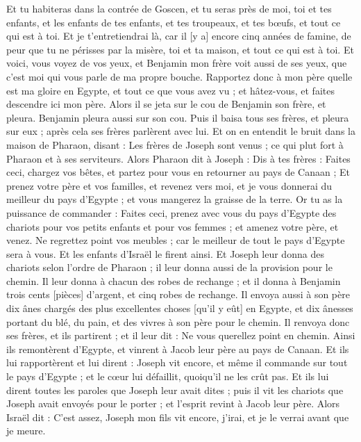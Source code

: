 \begin{multicols}{2}
Et tu habiteras dans la contrée de Goscen, et tu seras près de moi, toi et tes enfants, et les enfants de tes enfants, et tes troupeaux, et tes bœufs, et tout ce qui est à toi.
Et je t'entretiendrai là, car il [y a] encore cinq années de famine, de peur que tu ne périsses par la misère, toi et ta maison, et tout ce qui est à toi.
Et voici, vous voyez de vos yeux, et Benjamin mon frère voit aussi de ses yeux, que c'est moi qui vous parle de ma propre bouche.
Rapportez donc à mon père quelle est ma gloire en Egypte, et tout ce que vous avez vu ; et hâtez-vous, et faites descendre ici mon père.
Alors il se jeta sur le cou de Benjamin son frère, et pleura. Benjamin pleura aussi sur son cou.
Puis il baisa tous ses frères, et pleura sur eux ; après cela ses frères parlèrent avec lui.
Et on en entendit le bruit dans la maison de Pharaon, disant : Les frères de Joseph sont venus ; ce qui plut fort à Pharaon et à ses serviteurs.
Alors Pharaon dit à Joseph : Dis à tes frères : Faites ceci, chargez vos bêtes, et partez pour vous en retourner au pays de Canaan ;
Et prenez votre père et vos familles, et revenez vers moi, et je vous donnerai du meilleur du pays d'Egypte ; et vous mangerez la graisse de la terre.
Or tu as la puissance de commander : Faites ceci, prenez avec vous du pays d'Egypte des chariots pour vos petits enfants et pour vos femmes ; et amenez votre père, et venez.
Ne regrettez point vos meubles ; car le meilleur de tout le pays d'Egypte sera à vous.
Et les enfants d'Israël le firent ainsi. Et Joseph leur donna des chariots selon l'ordre de Pharaon ; il leur donna aussi de la provision pour le chemin.
Il leur donna à chacun des robes de rechange ; et il donna à Benjamin trois cents [pièces] d'argent, et cinq robes de rechange.
Il envoya aussi à son père dix ânes chargés des plus excellentes choses [qu'il y eût] en Egypte, et dix ânesses portant du blé, du pain, et des vivres à son père pour le chemin.
Il renvoya donc ses frères, et ils partirent ; et il leur dit : Ne vous querellez point en chemin.
Ainsi ils remontèrent d'Egypte, et vinrent à Jacob leur père au pays de Canaan.
Et ils lui rapportèrent et lui dirent : Joseph vit encore, et même il commande sur tout le pays d'Egypte ; et le cœur lui défaillit, quoiqu'il ne les crût pas.
Et ils lui dirent toutes les paroles que Joseph leur avait dites ; puis il vit les chariots que Joseph avait envoyés pour le porter ; et l'esprit revint à Jacob leur père.
Alors Israël dit : C'est assez, Joseph mon fils vit encore, j'irai, et je le verrai avant que je meure.

\end{multicols}
